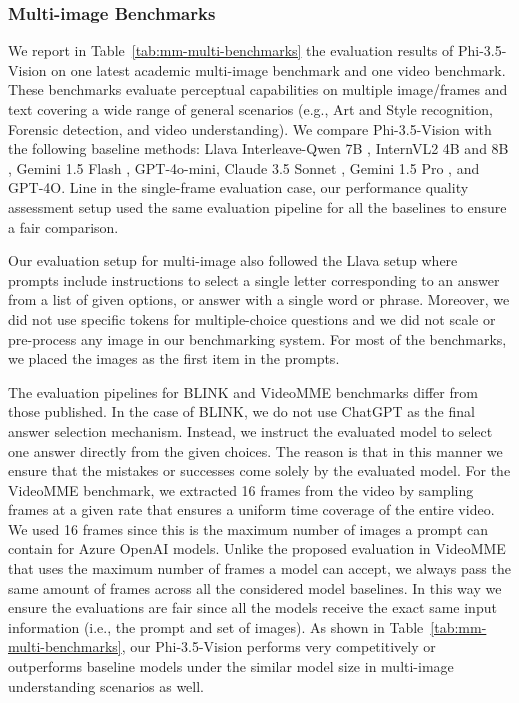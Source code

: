 \subsubsection{Multi-image Benchmarks}
We report in Table~\ref{tab:mm-multi-benchmarks} the evaluation results of Phi-3.5-Vision on one latest academic multi-image benchmark and one video benchmark. These benchmarks evaluate perceptual capabilities on multiple image/frames and text covering a wide range of general scenarios (e.g., Art and Style recognition, Forensic detection, and video understanding). We compare Phi-3.5-Vision with the following baseline methods: Llava Interleave-Qwen 7B \cite{li2024llava}, InternVL2 4B and 8B \cite{chen2024far}, Gemini 1.5 Flash \cite{team2023gemini}, GPT-4o-mini, Claude 3.5 Sonnet \cite{anthropic2024claude}, Gemini 1.5 Pro \cite{team2023gemini}, and GPT-4O. Line in the single-frame evaluation case, our performance quality assessment setup used the same evaluation pipeline for all the baselines to ensure a fair comparison.

Our evaluation setup for multi-image also followed the Llava setup where  prompts include instructions to select a single letter corresponding to an answer from a list of given options, or answer with a single word or phrase. Moreover, we did not use specific tokens for multiple-choice questions and we did not scale or pre-process any image in our benchmarking system. For most of the benchmarks, we placed the images as the first item in the prompts.

The evaluation pipelines for BLINK and VideoMME benchmarks differ from those published. In the case of BLINK, we do not use ChatGPT as the final answer selection mechanism. Instead, we instruct the evaluated model to select one answer directly from the given choices. The reason is that in this manner we ensure that the mistakes or successes come solely by the evaluated model. For the VideoMME benchmark, we extracted 16 frames from the video by sampling frames at a given rate that ensures a uniform time coverage of the entire video. We used 16 frames since this is the maximum number of images a prompt can contain for Azure OpenAI models. Unlike the proposed evaluation in VideoMME that uses the maximum number of frames a model can accept, we always pass the same amount of frames across all the considered model baselines. In this way we ensure the evaluations are fair since all the models receive the exact same input information (i.e., the prompt and set of images). As shown in Table~\ref{tab:mm-multi-benchmarks}, our Phi-3.5-Vision performs very competitively or outperforms baseline models under the similar model size in multi-image understanding scenarios as well.

